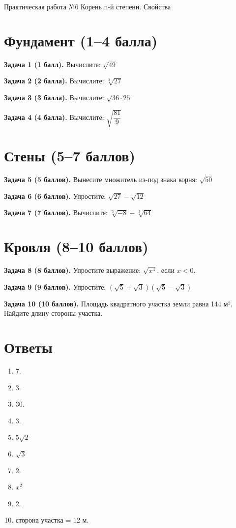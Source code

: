 \documentclass{umk-matematika}
\begin{document}
\maketitlepage
    {Практическая работа №6}
    {Корень n-й степени. Свойства}
    {}

\section{Фундамент (1--4 балла)}

\textbf{Задача 1 (1 балл).} Вычислите: $\sqrt{49}$

\textbf{Задача 2 (2 балла).} Вычислите: $\sqrt[3]{27}$

\textbf{Задача 3 (3 балла).} Вычислите: $\sqrt{36 \cdot 25}$

\textbf{Задача 4 (4 балла).} Вычислите: $\sqrt{\dfrac{81}{9}}$

\section{Стены (5--7 баллов)}

\textbf{Задача 5 (5 баллов).} Вынесите множитель из-под знака корня: $\sqrt{50}$

\textbf{Задача 6 (6 баллов).} Упростите: $\sqrt{27} - \sqrt{12}$

\textbf{Задача 7 (7 баллов).} Вычислите: $\sqrt[3]{-8} + \sqrt[3]{64}$

\section{Кровля (8--10 баллов)}

\textbf{Задача 8 (8 баллов).} Упростите выражение: $\sqrt{x^4}$, если $x < 0$.

\textbf{Задача 9 (9 баллов).} Упростите: $(\sqrt{5} + \sqrt{3})(\sqrt{5} - \sqrt{3})$

\textbf{Задача 10 (10 баллов).} Площадь квадратного участка земли равна 144 м². Найдите длину стороны участка.

\newpage
\section*{Ответы}

\begin{enumerate}
  \item 7.
  \item 3.
  \item 30.
  \item 3.
  \item $5\sqrt{2}$
  \item $\sqrt{3}$
  \item 2.
  \item $x^2$
  \item 2.
  \item сторона участка = 12 м.
\end{enumerate}
\end{document}
